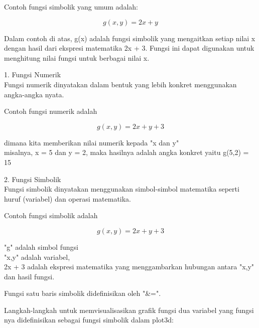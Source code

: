 \documentclass{article}
\begin{document}
\begin{eulernotebook}
\begin{eulercomment}
\begin{eulercomment}
\begin{eulercomment}
\begin{eulercomment}
\begin{eulercomment}
Contoh fungsi simbolik yang umum adalah:

\end{eulercomment}
\begin{eulerformula}
\[
g(x,y) = 2x + y
\]
\end{eulerformula}
\begin{eulercomment}
Dalam contoh di atas, g(x) adalah fungsi simbolik yang mengaitkan
setiap nilai x dengan hasil dari ekspresi matematika 2x + 3. Fungsi
ini dapat digunakan untuk menghitung nilai fungsi untuk berbagai nilai
x.

\end{eulercomment}
\begin{eulercomment}
1. Fungsi Numerik\\
Fungsi numerik dinyatakan dalam bentuk yang lebih konkret menggunakan
angka-angka nyata.

Contoh fungsi numerik adalah

\end{eulercomment}
\begin{eulerformula}
\[
g(x,y) = 2x + y + 3
\]
\end{eulerformula}
\begin{eulercomment}
dimana kita memberikan nilai numerik kepada "x dan y"\\
misalnya, x = 5 dan y = 2, maka hasilnya adalah angka konkret yaitu
g(5,2) = 15

2. Fungsi Simbolik\\
Fungsi simbolik dinyatakan menggunakan simbol-simbol matematika
seperti huruf (variabel) dan operasi matematika.

Contoh fungsi simbolik adalah

\end{eulercomment}
\begin{eulerformula}
\[
g(x,y) = 2x + y + 3
\]
\end{eulerformula}
\begin{eulercomment}
"g" adalah simbol fungsi\\
"x,y" adalah variabel,\\
2x + 3 adalah ekspresi matematika yang menggambarkan hubungan antara
"x,y" dan hasil fungsi.

\end{eulercomment}
\begin{eulercomment}
Fungsi satu baris simbolik didefinisikan oleh "\&=".

Langkah-langkah untuk memvisualisasikan grafik fungsi dua variabel
yang fungsi nya didefinisikan sebagai fungsi simbolik dalam plot3d:


\end{eulercomment}
\end{eulercomment}
\end{eulercomment}
\end{eulercomment}
\end{eulercomment}
\end{eulernotebook}
\end{document}
